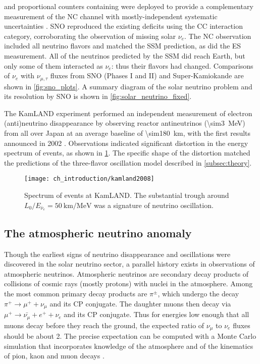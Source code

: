 and proportional counters containing 
were deployed to provide a complementary measurement of the NC channel
with mostly-independent systematic uncertainties \cite{sno_ncd_instrumentation}.
SNO reproduced the existing deficits using the CC interaction category,
corroborating the observation of missing solar $\nu_e$.
The NC observation included all neutrino flavors and matched the SSM prediction,
as did the ES measurement.
All of the neutrinos predicted by the SSM did reach Earth,
but only some of them interacted as $\nu_e$: thus their flavors had changed.
Comparisons of $\nu_e$ with $\nu_{\mu,\tau}$ fluxes
from SNO (Phases I and II) and Super-Kamiokande are shown in \cref{fig:sno_plots}.
A summary diagram of the solar neutrino problem and its resolution by SNO
is shown in \cref{fig:solar_neutrino_fixed}.

The KamLAND experiment performed
an independent measurement of electron (anti)\-neutrino disappearance
by observing reactor antineutrinos (\SI{\sim3}{\MeV}) from all over Japan
at an average baseline of \SI{\sim180}{\km},
with the first results announced in 2002 \cite{kamland_first}.
Observations indicated significant distortion
in the energy spectrum of \nuebar{} events,
as shown in \cref{fig:kamland_spec}.
The specific shape of the distortion
matched the predictions of the three-flavor oscillation model
described in \cref{subsec:theory}.

\begin{figure}
    \centering
    \texttt{[image: ch\_introduction/kamland2008]}
    \caption{
        Spectrum of \nuebar{} events at KamLAND.
        The substantial trough around $L_0/E_{\bar{\nu}_e} = \SI{50}{\km\per\MeV}$
        was a signature of neutrino oscillation.
    }
    \label{fig:kamland_spec}
\end{figure}

\subsection{The atmospheric neutrino anomaly}
\label{subsec:atmospheric_anomaly}

Though the earliest signs of neutrino disappearance and oscillations
were discovered in the solar neutrino sector,
a parallel history exists in observations of atmospheric neutrinos.
Atmospheric neutrinos are secondary decay products of
collisions of cosmic rays (mostly protons) with nuclei in the atmosphere.
Among the most common primary decay products are $\pi^{\pm}$,
which undergo the decay $\pi^+ \to \mu^+ + \nu_\mu$ and its CP conjugate.
The daughter muons then decay via $\mu^+ \to \bar{\nu_\mu} + e^+ + \nu_e$
and its CP conjugate.
Thus for energies low enough that all muons decay before they reach the ground,
the expected ratio of $\nu_\mu$ to $\nu_e$ fluxes should be about 2.
The precise expectation can be computed with a Monte Carlo simulation
that incorporates knowledge of the atmosphere and of the kinematics of
pion, kaon and muon decays \cite{neutrino_textbook}.


